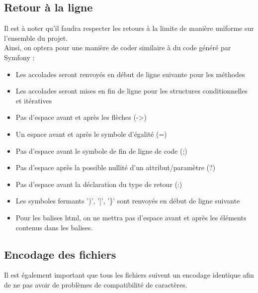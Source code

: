 \documentclass{article}
\begin{document}
        \subsection{Retour à la ligne}
            Il est à noter qu'il faudra respecter les retours à la limite de manière uniforme sur l'ensemble du projet. \\
            \indent Ainsi, on optera pour une manière de coder similaire à du code généré par Symfony : 
            \begin{itemize}
                \item Les accolades seront renvoyés en début de ligne suivante pour les méthodes
                \item Les accolades seront mises en fin de ligne pour les structures conditionnelles et itératives
                \item Pas d'espace avant et après les flèches (->)
                \item Un espace avant et après le symbole d'égalité (=)
                \item Pas d'espace avant le symbole de fin de ligne de code (;)
                \item Pas d'espace après la possible nullité d'un attribut/paramètre (?)
                \item Pas d'espace avant la déclaration du type de retour (:)
                \item Les symboles fermants ')', ']', '\}' sont renvoyés en début de ligne suivante
                \item Pour les balises html, on ne mettra pas d'espace avant et après les éléments contenus dans les balises.
            \end{itemize}
            
        \subsection{Encodage des fichiers}
            Il est également important que tous les fichiers suivent un encodage identique afin de ne pas avoir de problèmes de compatibilité de caractères.
\end{document}
